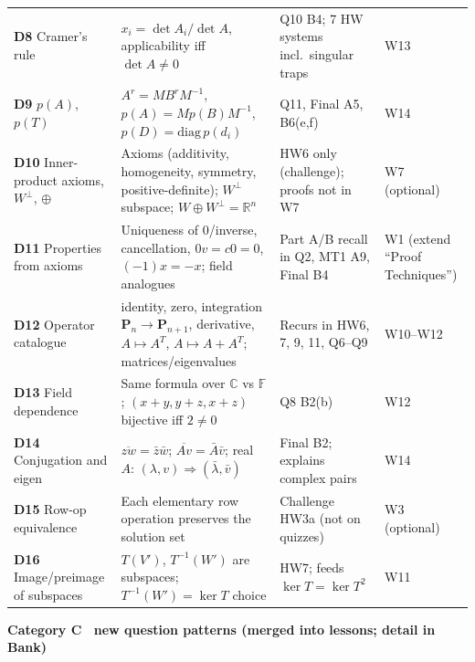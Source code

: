 \documentclass[9pt]{article}
\newcommand{\sub}[1]{\vspace{3pt}\par{\bfseries\color{NAVY}#1}\nopagebreak\par}
\begin{document}
{\begin{longtable}{@{}p{2.6cm}p{5.6cm}p{4.6cm}p{3.6cm}@{}}
\textbf{D8} Cramer's rule & $x_i=\det A_i/\det A$, applicability iff $\det A\ne0$ & Q10 B4; 7 HW systems incl.\ singular traps & W13\\
\textbf{D9} $p(A)$, $p(T)$ & $A^r=MB^rM^{-1}$, $p(A)=Mp(B)M^{-1}$, $p(D)=\mathrm{diag}\,p(d_i)$ & Q11, Final A5, B6(e,f) & W14\\
\textbf{D10} Inner-product axioms, $W^\perp$, $\oplus$ & Axioms (additivity, homogeneity, symmetry, positive-definite); $W^\perp$ subspace; $W\oplus W^\perp=\mathbb R^n$ & HW6 only (challenge); proofs not in W7 & W7 (optional)\\
\textbf{D11} Properties from axioms & Uniqueness of $0$/inverse, cancellation, $0v=c0=0$, $(-1)x=-x$; field analogues & Part A/B recall in Q2, MT1 A9, Final B4 & W1 (extend ``Proof Techniques'')\\
\textbf{D12} Operator catalogue & identity, zero, integration $\mathbf P_n\to\mathbf P_{n+1}$, derivative, $A\mapsto A^T$, $A\mapsto A+A^T$; matrices/eigenvalues & Recurs in HW6, 7, 9, 11, Q6--Q9 & W10--W12\\
\textbf{D13} Field dependence & Same formula over $\mathbb C$ vs $\mathbb F$; $(x{+}y,y{+}z,x{+}z)$ bijective iff $2\ne0$ & Q8 B2(b) & W12\\
\textbf{D14} Conjugation and eigen & $\overline{zw}=\bar z\bar w$; $\overline{Av}=\bar A\bar v$; real $A$: $(\lambda,v)\Rightarrow(\bar\lambda,\bar v)$ & Final B2; explains complex pairs & W14\\
\textbf{D15} Row-op equivalence & Each elementary row operation preserves the solution set & Challenge HW3a (not on quizzes) & W3 (optional)\\
\textbf{D16} Image/preimage of subspaces & $T(V')$, $T^{-1}(W')$ are subspaces; $T^{-1}(W')=\ker T$ choice & HW7; feeds $\ker T=\ker T^2$ & W11\\\bottomrule
\end{longtable}}
\sub{Category C \textemdash\ new question patterns (merged into lessons; detail in Bank)}
\end{document}
